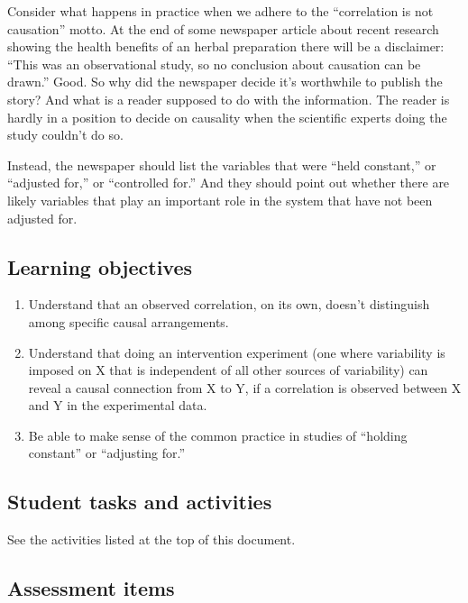 \documentclass[nofonts,]{tufte-handout}
\providecommand{\tightlist}{%
  \setlength{\itemsep}{0pt}\setlength{\parskip}{0pt}}
\begin{document}
Consider what happens in practice when we adhere to the ``correlation is
not causation'' motto. At the end of some newspaper article about recent
research showing the health benefits of an herbal preparation there will
be a disclaimer: ``This was an observational study, so no conclusion
about causation can be drawn.'' Good. So why did the newspaper decide
it's worthwhile to publish the story? And what is a reader supposed to
do with the information. The reader is hardly in a position to decide on
causality when the scientific experts doing the study couldn't do so.

Instead, the newspaper should list the variables that were ``held
constant,'' or ``adjusted for,'' or ``controlled for.'' And they should
point out whether there are likely variables that play an important role
in the system that have not been adjusted for.

\hypertarget{learning-objectives-1}{%
\subsection{Learning objectives}\label{learning-objectives-1}}

\begin{enumerate}
\def\labelenumi{\arabic{enumi}.}
\tightlist
\item
  Understand that an observed correlation, on its own, doesn't
  distinguish among specific causal arrangements.
\item
  Understand that doing an intervention experiment (one where
  variability is imposed on X that is independent of all other sources
  of variability) can reveal a causal connection from X to Y, if a
  correlation is observed between X and Y in the experimental data.
\item
  Be able to make sense of the common practice in studies of ``holding
  constant'' or ``adjusting for.''
\end{enumerate}

\hypertarget{student-tasks-and-activities}{%
\subsection{Student tasks and
activities}\label{student-tasks-and-activities}}

See the activities listed at the top of this document.

\hypertarget{assessment-items}{%
\subsection{Assessment items}\label{assessment-items}}
\end{document}
